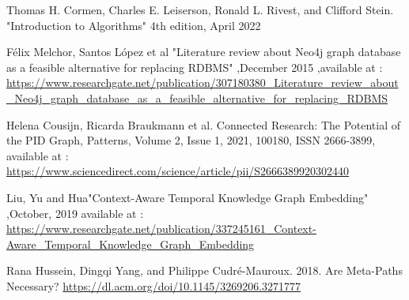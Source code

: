 \documentclass[conference]{IEEEtran}
\begin{document}
\begin{thebibliography}{00}
 Thomas H. Cormen, Charles E. Leiserson, Ronald L. Rivest, and Clifford Stein. "Introduction to Algorithms" 4th edition, April 2022

Félix Melchor, Santos López et al "Literature review about Neo4j graph database as a feasible alternative for replacing RDBMS" ,December 2015 ,available at : \url{https://www.researchgate.net/publication/307180380_Literature_review_about_Neo4j_graph_database_as_a_feasible_alternative_for_replacing_RDBMS}

 Helena Cousijn, Ricarda Braukmann et al.
Connected Research: The Potential of the PID Graph,
Patterns,
Volume 2, Issue 1,
2021,
100180,
ISSN 2666-3899,
available at : \url{https://www.sciencedirect.com/science/article/pii/S2666389920302440}

Liu, Yu and Hua"Context-Aware Temporal Knowledge Graph Embedding" ,October, 2019
available at : \url{https://www.researchgate.net/publication/337245161_Context-Aware_Temporal_Knowledge_Graph_Embedding}

Rana Hussein, Dingqi Yang, and Philippe Cudré-Mauroux. 2018. Are Meta-Paths Necessary? \url{https://dl.acm.org/doi/10.1145/3269206.3271777}

\end{thebibliography}
\end{document}
